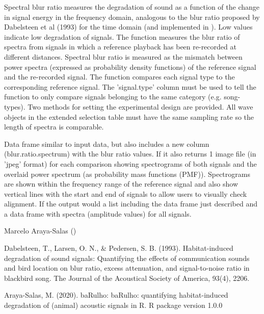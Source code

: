 \documentclass[letterpaper]{book}
\begin{document}
\begin{Details}\relax
Spectral blur ratio measures the degradation of sound as a function of the change in signal energy in the frequency domain, analogous to the blur ratio proposed by Dabelsteen et al (1993) for the time domain (and implemented in ). Low values indicate low degradation of signals. The function measures the blur ratio of spectra from signals in which a reference playback has been re-recorded at different distances. Spectral blur ratio is measured as the mismatch between power spectra (expressed as probability density functions) of the reference signal and the re-recorded signal. The function compares each signal type to the corresponding reference signal. The 'signal.type' column must be used to tell the function to only compare signals belonging to the same category (e.g. song-types). Two methods for setting the experimental design are provided. All wave objects in the extended selection table must have the same sampling rate so the length of spectra is comparable.
\end{Details}
%
\begin{Value}
Data frame similar to input data, but also includes a new column (blur.ratio.spectrum)
with the blur ratio values. If  it also returns 1 image file (in 'jpeg' format) for each comparison showing spectrograms of both signals and the overlaid power spectrum (as probability mass functions (PMF)).  Spectrograms are shown within the frequency range of the reference signal and also show vertical lines with the start and end of signals to allow users to visually check alignment. If  the output would a list including the data frame just described and a data frame with spectra (amplitude values) for all signals.
\end{Value}
%
\begin{Author}\relax
Marcelo Araya-Salas ()
\end{Author}
%
\begin{References}\relax

Dabelsteen, T., Larsen, O. N., \& Pedersen, S. B. (1993). Habitat-induced degradation of sound signals: Quantifying the effects of communication sounds and bird location on blur ratio, excess attenuation, and signal-to-noise ratio in blackbird song. The Journal of the Acoustical Society of America, 93(4), 2206.

Araya-Salas, M. (2020). baRulho: baRulho: quantifying habitat-induced degradation of (animal) acoustic signals in R. R package version 1.0.0

\end{References}
\end{document}
